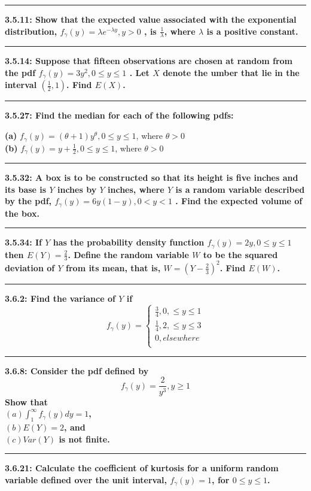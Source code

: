 \documentclass[11pt]{article}
\newcommand\question[2]{\vspace{.25in}\hrule\textbf{#1: #2}\vspace{.5em}\vspace{.10in}}
\renewcommand\part[1]{\vspace{.10in}\textbf{(#1)}}
\begin{document}
\question{3.5.11}
{Show that the expected value associated with the exponential distribution,
$f_{\gamma} (y) = \lambda e^{- \lambda y},y > 0$
, is $\frac{1}{\lambda}$, where $\lambda$ is a positive constant.}


\question{3.5.14}
{Suppose that fifteen observations are chosen at random from the pdf 
$f_{\gamma} (y) = 3y^{2}, 0 \leq y \leq 1$
. Let $X$ denote the umber that lie in the interval 
$(\frac{1}{2}, 1)$. Find $E(X)$.}


\question{3.5.27}
{Find the median for each of the following pdfs:}

\part{a} $f_{\gamma} (y) = (\theta + 1)y^{\theta}, 0 \leq y \leq 1$, where $\theta > 0$
\\ 
\part{b} $f_{\gamma} (y) = y + \frac{1}{2}, 0 \leq y \leq 1$, where $\theta > 0$


\question{3.5.32}
{A box is to be constructed so that its height is five inches and its base is
$Y$ inches by $Y$ inches, where $Y$ is a random variable described by the pdf,
$f_{\gamma}(y) = 6y(1-y),0 < y < 1$
. Find the expected volume of the box.}


\question{3.5.34}
{If $Y$ has the probability density function 
$f_{\gamma} (y) = 2y, 0 \leq y \leq 1$
then $E(Y) = \frac{2}{3}$. Define the random variable $W$ to be the squared deviation
of $Y$ from its mean, that is, $W = (Y-\frac{2}{3})^{2}$. Find $E(W)$.}


\question{3.6.2}
{Find the variance of $Y$ if 
\[
    f_{\gamma} (y) =
        \begin{cases}
            \frac{3}{4}, 0, \leq y \leq 1 \\
            \frac{1}{4}, 2, \leq y \leq 3 \\
            0, elsewhere \\
        \end{cases}
\]}


\question{3.6.8}
{Consider the pdf defined by 
    \[
        f_{\gamma}(y) = \frac{2}{y^{3}}, y \geq 1
    \]
Show that \\
$(a) \int_{1}^{\infty} f_{\gamma}(y) dy = 1$, \\
$(b) E(Y) = 2$, and \\
$(c) Var(Y)$ is not finite.
}


\question{3.6.21}
{Calculate the coefficient of kurtosis for a uniform random variable defined
over the unit interval, $f_{\gamma}(y) = 1$, for $0 \leq y \leq 1$. }
\end{document}
